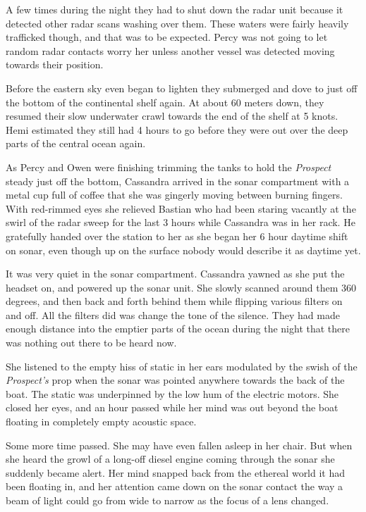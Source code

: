 \documentclass[]{scrbook}
\begin{document}
A few times during the night they had to shut down the radar unit
because it detected other radar scans washing over them. These waters
were fairly heavily trafficked though, and that was to be expected.
Percy was not going to let random radar contacts worry her unless
another vessel was detected moving towards their position.

Before the eastern sky even began to lighten they submerged and dove to
just off the bottom of the continental shelf again. At about 60 meters
down, they resumed their slow underwater crawl towards the end of the
shelf at 5 knots. Hemi estimated they still had 4 hours to go before
they were out over the deep parts of the central ocean again.

As Percy and Owen were finishing trimming the tanks to hold the
\emph{Prospect} steady just off the bottom, Cassandra arrived in the
sonar compartment with a metal cup full of coffee that she was gingerly
moving between burning fingers. With red-rimmed eyes she relieved
Bastian who had been staring vacantly at the swirl of the radar sweep
for the last 3 hours while Cassandra was in her rack. He gratefully
handed over the station to her as she began her 6 hour daytime shift on
sonar, even though up on the surface nobody would describe it as daytime
yet.

It was very quiet in the sonar compartment. Cassandra yawned as she put
the headset on, and powered up the sonar unit. She slowly scanned around
them 360 degrees, and then back and forth behind them while flipping
various filters on and off. All the filters did was change the tone of
the silence. They had made enough distance into the emptier parts of the
ocean during the night that there was nothing out there to be heard now.

She listened to the empty hiss of static in her ears modulated by the
swish of the \emph{Prospect's} prop when the sonar was pointed anywhere
towards the back of the boat. The static was underpinned by the low hum
of the electric motors. She closed her eyes, and an hour passed while
her mind was out beyond the boat floating in completely empty acoustic
space.

Some more time passed. She may have even fallen asleep in her chair. But
when she heard the growl of a long-off diesel engine coming through the
sonar she suddenly became alert. Her mind snapped back from the ethereal
world it had been floating in, and her attention came down on the sonar
contact the way a beam of light could go from wide to narrow as the
focus of a lens changed.
\end{document}
